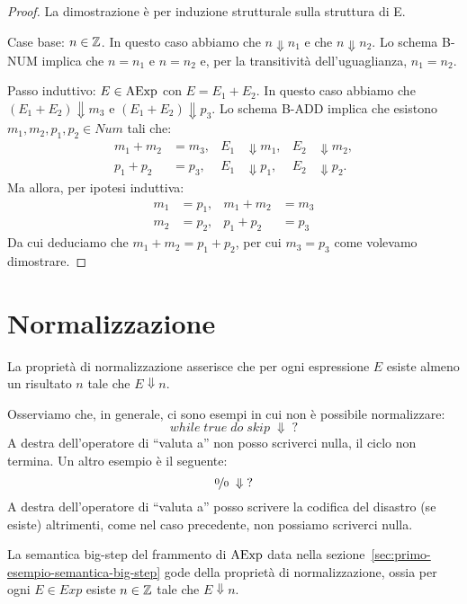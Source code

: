 \begin{proof}
La dimostrazione è per induzione strutturale sulla struttura di E.

Case base: $n \in \mathbb{Z}$.
In questo caso abbiamo che $n \Downarrow n_1$ e che $n \Downarrow n_2$.
Lo schema B-NUM implica che $n = n_1$ e $n = n_2$ e,
per la transitività dell'uguaglianza, $n_1 = n_2$.

Passo induttivo: $E \in \mathrm{AExp}$ con $E = E_1 + E_2$.
In questo caso abbiamo che $(E_1 + E_2) \Downarrow m_3$
e $(E_1 + E_2) \Downarrow p_3$.
Lo schema B-ADD implica che esistono
$m_1, m_2, p_1, p_2 \in Num$ tali che:
\begin{align*}
  m_1 + m_2 &= m_3, & E_1 &\Downarrow m_1, & E_2 &\Downarrow m_2, \\
  p_1 + p_2 &= p_3, & E_1 &\Downarrow p_1, & E_2 &\Downarrow p_2.
\end{align*}
Ma allora, per ipotesi induttiva:
\begin{align*}
m_1 &= p_1, & m_1+m_2 &= m_3 \\
m_2 &= p_2, & p_1 + p_2 &= p_3
\end{align*}
Da cui deduciamo che $ m_1 + m_2 = p_1 + p_2$, per cui
$m_3 = p_3$ come volevamo dimostrare.
\end{proof}

\section{Normalizzazione}
La proprietà di normalizzazione asserisce che per ogni espressione $E$ esiste almeno un risultato
$n$ tale che $E \Downarrow n$.

Osserviamo che, in generale, ci sono esempi in cui non è possibile normalizzare:
$$ while \; true \; do \; skip \; \Downarrow \; ? $$
A destra dell'operatore di ``valuta a'' non posso scriverci nulla, il ciclo non termina.
Un altro esempio è il seguente:
$$ \nicefrac{0}{0} \; \Downarrow \; ? $$
A destra dell'operatore di ``valuta a'' posso scrivere la codifica del disastro (se esiste)
altrimenti, come nel caso precedente, non possiamo scriverci nulla.

\begin{teorema}[Normalizzazione]
La semantica big-step del frammento di $\mathrm{AExp}$ data nella
sezione~\textup{\ref{sec:primo-esempio-semantica-big-step}}
gode della proprietà di normalizzazione, ossia per ogni
$E \in Exp$ esiste  $n \in \mathbb{Z}$ tale che $E \Downarrow n$.
\end{teorema}

